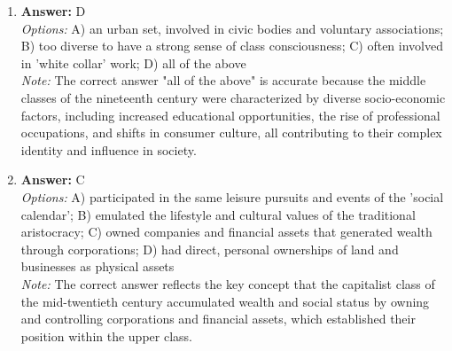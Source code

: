 \documentclass[12pt]{article}
\begin{document}
\begin{enumerate}[label=\arabic*.]
\item \textbf{Answer:} D
\\ \textit{Options:} A) an urban set, involved in civic bodies and voluntary associations; B) too diverse to have a strong sense of class consciousness; C) often involved in 'white collar' work; D) all of the above
\\ \textit{Note:} The correct answer "all of the above" is accurate because the middle classes of the nineteenth century were characterized by diverse socio-economic factors, including increased educational opportunities, the rise of professional occupations, and shifts in consumer culture, all contributing to their complex identity and influence in society.
\item \textbf{Answer:} C
\\ \textit{Options:} A) participated in the same leisure pursuits and events of the 'social calendar'; B) emulated the lifestyle and cultural values of the traditional aristocracy; C) owned companies and financial assets that generated wealth through corporations; D) had direct, personal ownerships of land and businesses as physical assets
\\ \textit{Note:} The correct answer reflects the key concept that the capitalist class of the mid-twentieth century accumulated wealth and social status by owning and controlling corporations and financial assets, which established their position within the upper class.
\end{enumerate}
\end{document}
